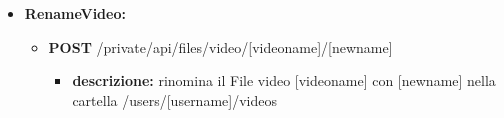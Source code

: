 {\begin{itemize}
\begin{itemize}
\begin{itemize}
				\end{itemize}
			\item   \textbf{DELETE} /private/api/files/video/[videoname]
				\begin{itemize} 
				\item \textbf{descrizione:} elimina il File video [videoname] dalla cartella /users/[username]/videos			

				\end{itemize}
			\end{itemize}
			
		\item \textbf{RenameVideo:}
			\begin{itemize}
			\item   \textbf{POST} /private/api/files/video/[videoname]/[newname] 
				\begin{itemize} 
				\item \textbf{descrizione:} rinomina il File video [videoname] con [newname] nella cartella /users/[username]/videos

				\end{itemize}
			\end{itemize}

			
	\end{itemize}
			
}